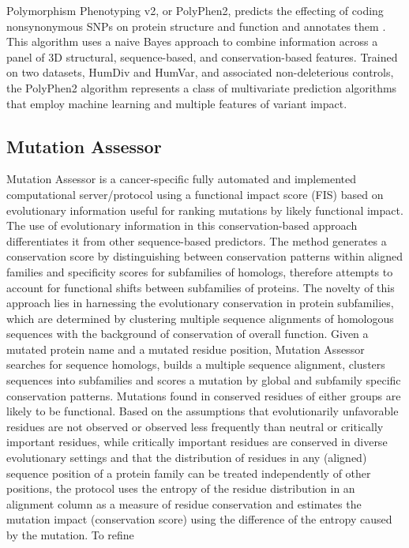 \documentclass{article}
\begin{document}
Polymorphism Phenotyping v2, or PolyPhen2, predicts the effecting of
coding nonsynonymous SNPs on protein structure and function and
annotates them \cite{Adzhubei2013-nj}. This algorithm uses a naive
Bayes approach to combine information across a panel of 3D structural,
sequence-based, and conservation-based features. Trained on two
datasets, HumDiv and HumVar, and associated non-deleterious controls,
the PolyPhen2 algorithm represents a class of multivariate prediction
algorithms that employ machine learning and multiple features of
variant impact. 

\subsection{Mutation Assessor}

Mutation Assessor is a cancer-specific fully automated and implemented
computational server/protocol using a functional impact score (FIS)
based on evolutionary information useful for ranking mutations by
likely functional impact. The use of evolutionary information in this
conservation-based approach differentiates it from other
sequence-based predictors.  The method generates a conservation score
by distinguishing between conservation patterns within aligned
families and specificity scores for subfamilies of homologs, therefore
attempts to account for functional shifts between subfamilies of
proteins. The novelty of this approach lies in harnessing the
evolutionary conservation in protein subfamilies, which are determined
by clustering multiple sequence alignments of homologous sequences
with the background of conservation of overall function. Given a
mutated protein name and a mutated residue position, Mutation Assessor
searches for sequence homologs, builds a multiple sequence alignment,
clusters sequences into subfamilies and scores a mutation by global
and subfamily specific conservation patterns. Mutations found in
conserved residues of either groups are likely to be functional. Based
on the assumptions that evolutionarily unfavorable residues are not
observed or observed less frequently than neutral or critically
important residues, while critically important residues are conserved
in diverse evolutionary settings and that the distribution of residues
in any (aligned) sequence position of a protein family can be treated
independently of other positions, the protocol uses the entropy of the
residue distribution in an alignment column as a measure of residue
conservation and estimates the mutation impact (conservation score)
using the difference of the entropy caused by the mutation. To refine
\end{document}
